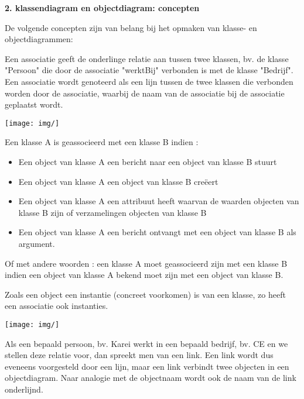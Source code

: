 \textbf{2. klassendiagram en objectdiagram: concepten}

De volgende concepten zijn van belang bij het opmaken van klasse- en objectdiagrammen:


Een associatie geeft de onderlinge relatie aan tussen twee klassen, bv. de klasse "Persoon" die door de associatie "werktBij" verbonden is met de klasse "Bedrijf". Een associatie wordt genoteerd als een lijn tussen de twee klassen die verbonden worden door de associatie, waarbij de naam van de associatie bij de associatie geplaatst wordt.


\begin{center}
\texttt{[image: img/]}%
\label{labelname}%
\end{center}

Een klasse A is geassocieerd met een klasse B indien :

\begin{itemize}
    \item Een object van klasse A een bericht naar een object van klasse B stuurt
    \item Een object van klasse A een object van klasse B creëert
    \item Een object van klasse A een attribuut heeft waarvan de waarden objecten van klasse B zijn of verzamelingen objecten van klasse B
    \item Een object van klasse A een bericht ontvangt met een object van klasse B als argument.
\end{itemize}

Of met andere woorden : een klasse A moet geassocieerd zijn met een klasse B indien een object van klasse A bekend moet zijn met een object van klasse B.


Zoals een object een instantie (concreet voorkomen) is van een klasse, zo heeft een associatie ook instanties.


\begin{center}
\texttt{[image: img/]}%
\label{labelname}%
\end{center}

Als een bepaald persoon, bv. Karei werkt in een bepaald bedrijf, bv. CE en we stellen deze relatie voor, dan spreekt men van een link. Een link wordt dus eveneens voorgesteld door een lijn, maar een link verbindt twee objecten in een objectdiagram.
Naar analogie met de objectnaam wordt ook de naam van de link onderlijnd.

